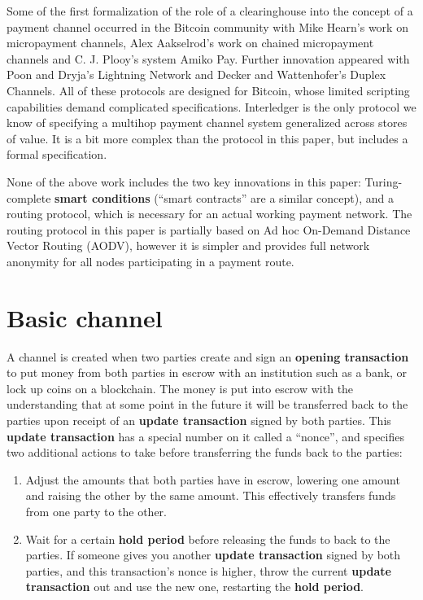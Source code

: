 \documentclass[a4paper]{article}
\newcommand{\bgls}[1]{\textbf{\gls{#1}}}
\newcommand{\bglspl}[1]{\textbf{\glspl{#1}}}
\begin{document}
Some of the first formalization of the role of a clearinghouse into the concept of a payment channel occurred in the Bitcoin community with Mike Hearn's work on micropayment channels\cite{btcwiki}\cite{bitcoinj}, Alex Aakselrod's work on chained micropayment channels\cite{blueadept} and C. J. Plooy's system Amiko Pay\cite{amiko}. Further innovation appeared with Poon and Dryja's Lightning Network\cite{lightning} and Decker and Wattenhofer's Duplex Channels\cite{duplexchannels}. All of these protocols are designed for Bitcoin, whose limited scripting capabilities demand complicated specifications. Interledger\cite{interledger} is the only protocol we know of specifying a multihop payment channel system generalized across stores of value. It is a bit more complex than the protocol in this paper, but includes a formal specification.

None of the above work includes the two key innovations in this paper: Turing-complete \bglspl{smart condition} (``smart contracts'' are a similar concept), and a routing protocol, which is necessary for an actual working payment network. The routing protocol in this paper is partially based on Ad hoc On-Demand Distance Vector Routing (AODV)\cite{aodv}, however it is simpler and provides full network anonymity for all nodes participating in a payment route.

\section{Basic channel}

A channel is created when two parties create and sign an \bgls{opening transaction} to put money from both parties in escrow with an institution such as a bank, or lock up coins on a blockchain. The money is put into escrow with the understanding that at some point in the future it will be transferred back to the parties upon receipt of an \bgls{update transaction} signed by both parties. This \bgls{update transaction} has a special number on it called a ``nonce'', and specifies two additional actions to take before transferring the funds back to the parties:

\begin{enumerate}
  \item Adjust the amounts that both parties have in escrow, lowering one amount and raising the other by the same amount. This effectively transfers funds from one party to the other.
  \item Wait for a certain \bgls{hold period} before releasing the funds to back to the parties. If someone gives you another \bgls{update transaction} signed by both parties, and this transaction's nonce is higher, throw the current \bgls{update transaction} out and use the new one, restarting the \bgls{hold period}.
\end{enumerate}
\end{document}
